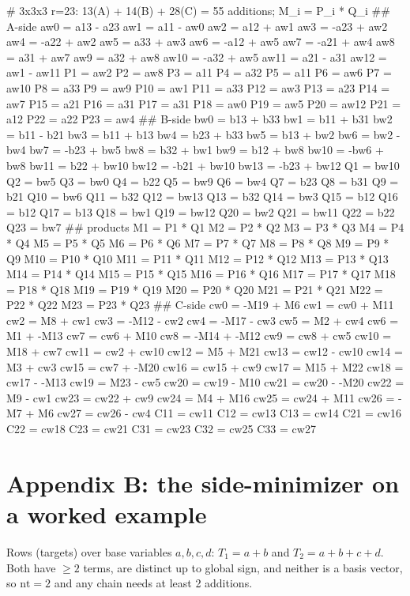 \documentclass[10pt]{article}
\begin{document}
\begin{Code}
# 3x3x3 r=23: 13(A) + 14(B) + 28(C) = 55 additions; M_i = P_i * Q_i
## A-side
aw0 = a13 - a23
aw1 = a11 - aw0
aw2 = a12 + aw1
aw3 = -a23 + aw2
aw4 = -a22 + aw2
aw5 = a33 + aw3
aw6 = -a12 + aw5
aw7 = -a21 + aw4
aw8 = a31 + aw7
aw9 = a32 + aw8
aw10 = -a32 + aw5
aw11 = a21 - a31
aw12 = aw1 - aw11
P1 = aw2
P2 = aw8
P3 = a11
P4 = a32
P5 = a11
P6 = aw6
P7 = aw10
P8 = a33
P9 = aw9
P10 = aw1
P11 = a33
P12 = aw3
P13 = a23
P14 = aw7
P15 = a21
P16 = a31
P17 = a31
P18 = aw0
P19 = aw5
P20 = aw12
P21 = a12
P22 = a22
P23 = aw4
## B-side
bw0 = b13 + b33
bw1 = b11 + b31
bw2 = b11 - b21
bw3 = b11 + b13
bw4 = b23 + b33
bw5 = b13 + bw2
bw6 = bw2 - bw4
bw7 = -b23 + bw5
bw8 = b32 + bw1
bw9 = b12 + bw8
bw10 = -bw6 + bw8
bw11 = b22 + bw10
bw12 = -b21 + bw10
bw13 = -b23 + bw12
Q1 = bw10
Q2 = bw5
Q3 = bw0
Q4 = b22
Q5 = bw9
Q6 = bw4
Q7 = b23
Q8 = b31
Q9 = b21
Q10 = bw6
Q11 = b32
Q12 = bw13
Q13 = b32
Q14 = bw3
Q15 = b12
Q16 = b12
Q17 = b13
Q18 = bw1
Q19 = bw12
Q20 = bw2
Q21 = bw11
Q22 = b22
Q23 = bw7
## products
M1 = P1 * Q1
M2 = P2 * Q2
M3 = P3 * Q3
M4 = P4 * Q4
M5 = P5 * Q5
M6 = P6 * Q6
M7 = P7 * Q7
M8 = P8 * Q8
M9 = P9 * Q9
M10 = P10 * Q10
M11 = P11 * Q11
M12 = P12 * Q12
M13 = P13 * Q13
M14 = P14 * Q14
M15 = P15 * Q15
M16 = P16 * Q16
M17 = P17 * Q17
M18 = P18 * Q18
M19 = P19 * Q19
M20 = P20 * Q20
M21 = P21 * Q21
M22 = P22 * Q22
M23 = P23 * Q23
## C-side
cw0 = -M19 + M6
cw1 = cw0 + M11
cw2 = M8 + cw1
cw3 = -M12 - cw2
cw4 = -M17 - cw3
cw5 = M2 + cw4
cw6 = M1 + -M13
cw7 = cw6 + M10
cw8 = -M14 + -M12
cw9 = cw8 + cw5
cw10 = M18 + cw7
cw11 = cw2 + cw10
cw12 = M5 + M21
cw13 = cw12 - cw10
cw14 = M3 + cw3
cw15 = cw7 + -M20
cw16 = cw15 + cw9
cw17 = M15 + M22
cw18 = cw17 - -M13
cw19 = M23 - cw5
cw20 = cw19 - M10
cw21 = cw20 - -M20
cw22 = M9 - cw1
cw23 = cw22 + cw9
cw24 = M4 + M16
cw25 = cw24 + M11
cw26 = -M7 + M6
cw27 = cw26 - cw4
C11 = cw11
C12 = cw13
C13 = cw14
C21 = cw16
C22 = cw18
C23 = cw21
C31 = cw23
C32 = cw25
C33 = cw27
\end{Code}

\section*{Appendix B: the side-minimizer on a worked example}

Rows (targets) over base variables $a, b, c, d$: $T_1 = a + b$ and
$T_2 = a + b + c + d$. Both have $\ge 2$ terms, are distinct up to
global sign, and neither is a basis vector, so $\mathrm{nt} = 2$ and any
chain needs at least 2 additions.
\end{document}
